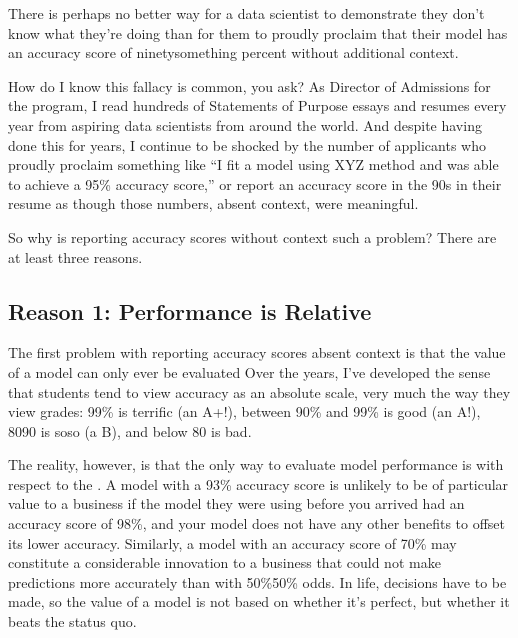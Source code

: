 \documentclass[letterpaper,10pt,english]{jupyterBook}
\begin{document}
\begin{sphinxShadowBox}

\sphinxAtStartPar
There is perhaps no better way for a data scientist to demonstrate they don’t know what they’re doing than for them to proudly proclaim that their model has an accuracy score of ninety\sphinxhyphen{}something percent without additional context.
\end{sphinxShadowBox}

\sphinxAtStartPar
How do I know this fallacy is common, you ask? As Director of Admissions for the  program, I read hundreds of Statements of Purpose essays and resumes every year from aspiring data scientists from around the world. And despite having done this for years, I continue to be shocked by the number of applicants who proudly proclaim something like “I fit a model using XYZ method and was able to achieve a 95\% accuracy score,” or report an accuracy score in the 90s in their resume as though those numbers, absent context, were meaningful.

\sphinxAtStartPar
So why is reporting accuracy scores without context such a problem? There are at least three reasons.


\subsection{Reason 1: Performance is Relative}
\label{\detokenize{30_questions/24_passive_internal_errors:reason-1-performance-is-relative}}
\sphinxAtStartPar
The first problem with reporting accuracy scores absent context is that the value of a model can only ever be evaluated  Over the years, I’ve developed the sense that students tend to view accuracy as an absolute scale, very much the way they view grades: 99\% is terrific (an A+!), between 90\% and 99\% is good (an A!), 80\sphinxhyphen{}90 is so\sphinxhyphen{}so (a B), and below 80 is bad.

\sphinxAtStartPar
The reality, however, is that the only way to evaluate model performance is with respect to the . A model with a 93\% accuracy score is unlikely to be of particular value to a business if the model they were using before you arrived had an accuracy score of 98\%, and your model does not have any other benefits to offset its lower accuracy. Similarly, a model with an accuracy score of 70\% may constitute a considerable innovation to a business that could not make predictions more accurately than with 50\%\sphinxhyphen{}50\% odds. In life, decisions have to be made, so the value of a model is not based on whether it’s perfect, but whether it beats the status quo.
\end{document}
